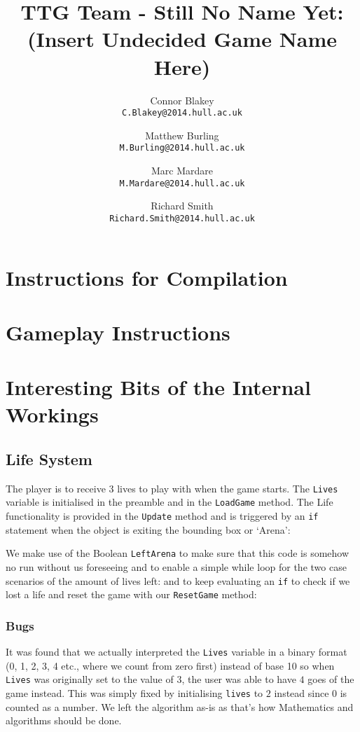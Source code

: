 \documentclass[11pt,a4paper]{article}
\title{TTG Team - Still No Name Yet: (Insert Undecided Game Name Here)}
\author{
  Connor Blakey\\
  \texttt{C.Blakey@2014.hull.ac.uk}
  \and
  Matthew Burling\\
  \texttt{M.Burling@2014.hull.ac.uk}
  \and
  Marc Mardare\\
  \texttt{M.Mardare@2014.hull.ac.uk}
  \and
  Richard Smith\\
  \texttt{Richard.Smith@2014.hull.ac.uk}
}
\begin{document}
\maketitle

\tableofcontents

\section{Instructions for Compilation}

\section{Gameplay Instructions}

\section{Interesting Bits of the Internal Workings}

  \subsection{Life System}
  The player is to receive 3 lives to play with when the game starts. The \texttt{Lives} variable is initialised in the preamble and in the \texttt{LoadGame} method. The Life functionality is provided in the \texttt{Update} method and is triggered by an \texttt{if} statement when the object is exiting the bounding box or `Arena':

  We make use of the Boolean \texttt{LeftArena} to make sure that this code is somehow no run without us foreseeing and to enable a simple while loop for the two case scenarios of the amount of lives left:
  and to keep evaluating an \texttt{if} to check if we lost a life and reset the game with our \texttt{ResetGame} method:

    \subsubsection{Bugs}
    It was found that we actually interpreted the \texttt{Lives} variable in a binary format (0, 1, 2, 3, 4 etc., where we count from zero first) instead of base 10 so when \texttt{Lives} was originally set to the value of $3$, the user was able to have $4$ goes of the game instead. This was simply fixed by initialising \texttt{lives} to $2$ instead since $0$ is counted as a number. We left the algorithm as-is as that's how Mathematics and algorithms should be done.
\end{document}
